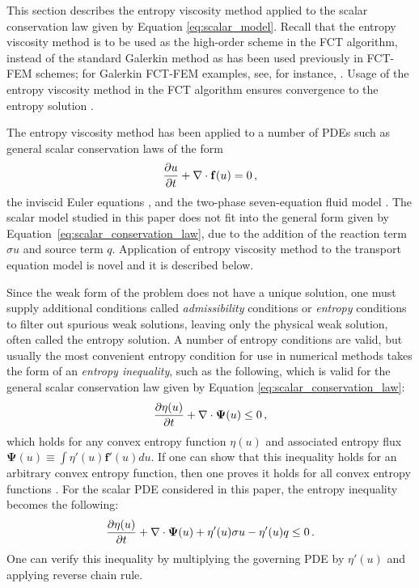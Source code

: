 
This section describes the entropy viscosity method applied to the scalar
conservation law given by Equation \eqref{eq:scalar_model}. Recall that the entropy
viscosity method is to be used as the high-order scheme in the FCT algorithm,
instead of the standard Galerkin method as has been used previously in FCT-FEM schemes;
for Galerkin FCT-FEM examples, see, for instance,
\cite{kuzmin_FCT,moller_2008,lohner,kuzmin_failsafe,kuzmin_closepacking}.
Usage of the entropy viscosity method in the FCT algorithm ensures convergence
to the entropy solution \cite{guermond_secondorder}.

The entropy viscosity method has been applied to a number of PDEs
such as general scalar conservation laws of the form
\begin{equation}\label{eq:scalar_conservation_law}
  \frac{\partial u}{\partial t} + \nabla\cdot\mathbf{f}(u) = 0 \,,
\end{equation}
the inviscid Euler equations \cite{guermond_ev,marco_low_mach},
and the two-phase seven-equation fluid model \cite{marco_SEM}. The scalar model studied
in this paper does not fit into the general form given by Equation~\eqref{eq:scalar_conservation_law},
due to
the addition of the reaction term $\sigma u$ and source term $q$. Application
of entropy viscosity method to the transport equation model is novel and it is described below.

Since the weak form of the problem does not have a unique solution, one
must supply additional conditions called \emph{admissibility} conditions or
\emph{entropy} conditions to filter out spurious weak solutions, leaving
only the physical weak solution, often called the entropy solution.
A number of entropy conditions are valid, but usually the most convenient
entropy condition for use in numerical methods takes the form of an
\emph{entropy inequality}, such as the following, which is valid for the
general scalar conservation law given by Equation \eqref{eq:scalar_conservation_law}:
\begin{equation}
  \frac{\partial \eta(u)}{\partial t} + \nabla\cdot\mathbf{\Psi}(u) \leq 0 \,,
\end{equation}
which holds for any convex entropy function $\eta(u)$ and associated entropy
flux $\mathbf{\Psi}(u) \equiv \int \eta'(u)\mathbf{f}'(u)du$.
If one can show that this inequality holds for an arbitrary
convex entropy function, then one proves it holds for all convex entropy
functions  \cite{leveque2002,guermond_ev}.
For the scalar PDE considered in this paper, the entropy inequality becomes
the following:
\begin{equation}
  \frac{\partial \eta(u)}{\partial t} + \nabla\cdot\mathbf{\Psi}(u) + \eta'(u)\sigma u - \eta'(u)q
    \leq 0 \,.
\end{equation}
One can verify this inequality by multiplying the governing PDE by $\eta'(u)$
and applying reverse chain rule.

